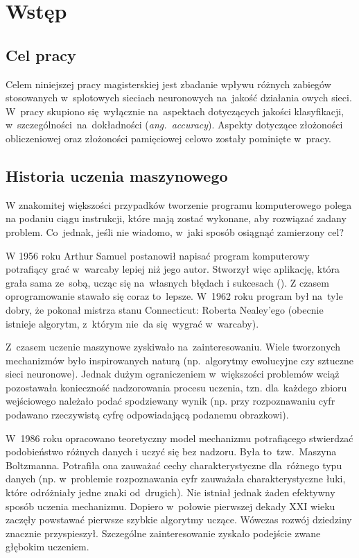 \chapter{Wstęp}
\section{Cel pracy}
Celem niniejszej pracy magisterskiej jest zbadanie wpływu różnych zabiegów
stosowanych w~splotowych sieciach neuronowych na~jakość działania owych sieci.
W~pracy skupiono się~wyłącznie na~aspektach dotyczących jakości klasyfikacji,
w~szczególności~na~dokładności (\textit{ang.~accuracy}). Aspekty dotyczące złożoności
obliczeniowej oraz złożoności pamięciowej celowo zostały pominięte w~pracy.

\section{Historia uczenia maszynowego}
W znakomitej większości przypadków tworzenie programu komputerowego polega
na podaniu ciągu instrukcji, które mają zostać wykonane, aby rozwiązać zadany
problem. Co~jednak, jeśli nie wiadomo, w~jaki sposób osiągnąć zamierzony cel?

W 1956 roku Arthur Samuel postanowił napisać program komputerowy
potrafiący grać w~warcaby lepiej niż jego autor. Stworzył więc aplikację,
która grała sama ze~sobą, ucząc się na~własnych błędach i sukcesach (\cite{checkers-samuel}).
Z czasem oprogramowanie stawało się coraz to~lepsze. W~1962 roku program był
na~tyle dobry, że pokonał mistrza stanu Connecticut: Roberta Nealey'ego
(obecnie istnieje algorytm, z~którym nie~da się~wygrać w~warcaby).

Z~czasem uczenie maszynowe zyskiwało na~zainteresowaniu.
Wiele tworzonych mechanizmów było inspirowanych naturą (np.~algorytmy
ewolucyjne czy sztuczne sieci neuronowe). Jednak dużym ograniczeniem
w~większości problemów wciąż pozostawała konieczność nadzorowania procesu
uczenia, tzn. dla~każdego zbioru wejściowego należało podać spodziewany wynik
(np. przy rozpoznawaniu cyfr podawano rzeczywistą cyfrę odpowiadającą podanemu
obrazkowi).

W~1986 roku opracowano teoretyczny model mechanizmu potrafiącego stwierdzać
podobieństwo różnych danych i uczyć się bez nadzoru. Była to~tzw.~Maszyna
Boltzmanna. Potrafiła ona zauważać cechy charakterystyczne dla~różnego typu
danych (np. w~problemie rozpoznawania cyfr zauważała charakterystyczne łuki,
które odróżniały jedne znaki od~drugich).
Nie istniał jednak żaden efektywny sposób uczenia mechanizmu.
Dopiero w~połowie pierwszej dekady XXI wieku zaczęły powstawać pierwsze szybkie
algorytmy uczące. Wówczas rozwój dziedziny znacznie przyspieszył.
Szczególne zainteresowanie zyskało podejście zwane głębokim uczeniem.

